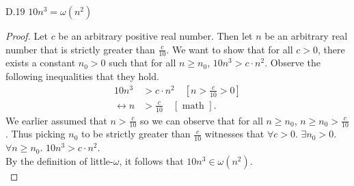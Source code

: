 \documentclass[10pt]{article}
\begin{document}
\begin{enumerate}[label={}]
            D.19 $10 n^3=\omega\left(n^2\right)$
            \begin{proof}
                  Let $c$ be an arbitrary positive real number.
                  Then let $n$ be an arbitrary real number that is strictly greater than $\frac{c}{10}$.
                  We want to show that for all $c>0$, there exists a constant $n_0 > 0$ such that for all $n\geq n_0$, $10 n^3>c \cdot n^2$.
                  Observe the following inequalities that they hold.
                  $$
                        \begin{aligned}
                              10 n^3                & >c \cdot n^2 \quad {\left[n>\frac{c}{10}>0\right] } \\
                              \longleftrightarrow n & >\frac{c}{10} \quad[\text { math }].
                        \end{aligned}
                  $$
                  We earlier assumed that $n>\frac{c}{10}$ so we can observe that for all $n\geq n_0$, $n\geq n_0>\frac{c}{10}$.
                  Thus picking $n_0$ to be strictly greater than $\frac{c}{10}$ witnesses that $\forall c>0$. $\exists n_0>0$. $\forall n \geq n_0$. $10 n^3>c \cdot n^2$.\\
                  By the definition of little-$\omega$, it follows that $10 n^3 \in \omega\left(n^2\right)$.\\
            \end{proof}

\end{enumerate}
\end{document}
